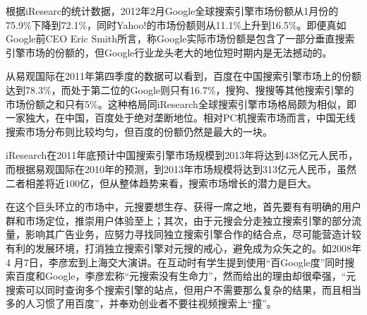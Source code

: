根据iResearc的统计数据，2012年2月Google全球搜索引擎市场份额从1月份的75.9\%下降到72.1\%，同时Yahoo!的市场份额则从11.1\%上升到16.5\%。即便真如Google前CEO Eric Smith所言，称Google实际市场份额是包含了一部分垂直搜索引擎市场的份额的，但Google行业龙头老大的地位短时期内是无法撼动的。

从易观国际在2011年第四季度的数据可以看到，百度在中国搜索引擎市场上的份额达到78.3\%，而处于第二位的Google则只有16.7\%，搜狗、搜搜等其他搜索引擎的市场份额之和只有5\%。这种格局同iResearch全球搜索引擎市场格局颇为相似，即一家独大，在中国，百度处于绝对垄断地位。相对PC机搜索市场而言，中国无线搜索市场分布则比较均匀，但百度的份额仍然是最大的一块。

iResearch在2011年底预计中国搜索引擎市场规模到2013年将达到438亿元人民币，而根据易观国际在2010年的预测，到2013年市场规模将达到313亿元人民币，虽然二者相差将近100亿，但从整体趋势来看，搜索市场增长的潜力是巨大。

在这个巨头环立的市场中，元搜要想生存、获得一席之地，首先要有有明确的用户群和市场定位，推崇用户体验至上；其次，由于元搜会分走独立搜索引擎的部分流量，影响其广告业务，应努力寻找同独立搜索引擎合作的结合点，尽可能营造计较有利的发展环境，打消独立搜索引擎对元搜的戒心，避免成为众矢之的。如2008年4 月7日，李彦宏到上海交大演讲。在互动时有学生提到使用“百Google度”同时搜索百度和Google，李彦宏称“元搜索没有生命力”，然而给出的理由却很牵强，“元搜索可以同时查询多个搜索引擎的站点，但用户不需要那么复杂的结果，而且相当多的人习惯了用百度”，并奉劝创业者不要往视频搜索上“撞”。


